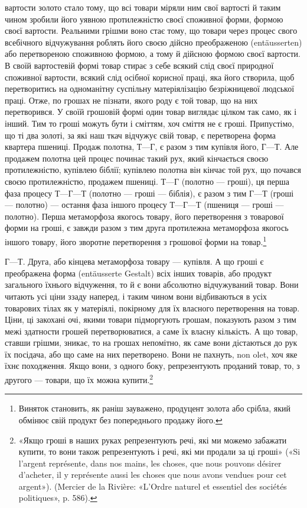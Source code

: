 \parcont{}  %
вартости золото стало тому, що всі товари міряли ним свої вартості
й таким чином зробили його уявною протилежністю своєї
споживної форми, формою своєї вартости. Реальними грішми
воно стає тому, що товари через процес свого всебічного відчужування
роблять його своєю дійсно преображеною (entäusserten)
або перетвореною споживною формою, а тому й дійсною формою
своєї вартости. В своїй вартостевій формі товар стирає з себе
всякий слід своєї природної споживної вартости, всякий слід
осібної корисної праці, яка його створила, щоб перетворитись
на одноманітну суспільну матеріялізацію безріжницевої людської
праці. Отже, по грошах не пізнати, якого роду є той товар,
що на них перетворився. У своїй грошовій формі один товар
виглядає цілком так само, як і інший. Тим то гроші можуть бути
і сміттям, хоч сміття не є гроші. Припустімо, що ті два золоті,
за які наш ткач відчужує свій товар, є перетворена форма квартера
пшениці. Продаж полотна, $Т — Г$, є разом з тим купівля
його, $Г — Т$. Але продажем полотна цей процес починає такий
рух, який кінчається своєю протилежністю, купівлею біблії;
купівлею полотна він кінчає той рух, що почався своєю протилежністю,
продажем пшениці. $Т — Г$ (полотно — гроші), ця перша
фаза процесу $Т — Г — Т$ (полотно — гроші — біблія), є разом
з тим $Г — Т$ (гроші — полотно) — остання фаза іншого процесу
$Т — Г — Т$ (пшениця — гроші — полотно). Перша метаморфоза
якогось товару, його перетворення з товарової форми на гроші,
є завжди разом з тим друга протилежна метаморфоза якогось
іншого товару, його зворотне перетворення з грошової форми на
товар.\footnote{
Виняток становить, як раніш зауважено, продуцент золота або
срібла, який обмінює свій продукт без попереднього продажу його.
}

$Г — Т$. Друга, або кінцева метаморфоза товару — купівля.
А що гроші є преображена форма (entäusserte Gestalt) всіх інших
товарів, або продукт загального їхнього відчуження, то й є вони
абсолютно відчужуваний товар. Вони читають усі ціни ззаду
наперед, і таким чином вони відбиваються в усіх товарових тілах
як у матеріялі, покірному для їх власного перетворення на товар.
Ціни, ці закохані очі, якими товари підморгують грошам, показують
разом з тим межі здатности грошей перетворюватися, а
саме їх власну кількість. А що товар, ставши грішми, зникає,
то на грошах непомітно, як саме вони дістаються до рук їх посідача,
або що саме на них перетворено. Вони не пахнуть, non olet,
хоч яке їхнє походження. Якщо вони, з одного боку, репрезентують
проданий товар, то, з другого — товари, що їх можна
купити.\footnote{
«Якщо гроші в наших руках репрезентують речі, які ми можемо
забажати купити, то вони також репрезентують і речі, які ми продали за
ці гроші» («Si l’argent représente, dans nos mains, les choses, que nous
pouvons désirer d’acheter, il y représente aussi les choses que nous avons
vendues pour cet argent»). (Mercier de la Rivière: «L’Ordre naturel et
essentiel des sociétés politiques», p. 586).
}
